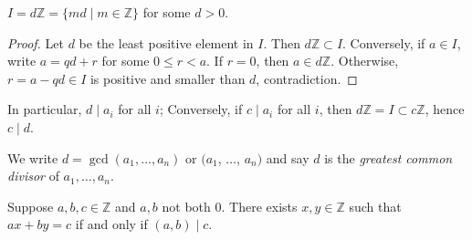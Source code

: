 \documentclass[a4paper, 10pt]{amsart}
\begin{document}
\begin{lemma}
  $I = d \mathbb{Z} = \{md \mid m \in \mathbb{Z}\}$ for some $d > 0$.
\end{lemma}
\begin{proof}
  Let $d$ be the least positive element in $I$. Then $d\mathbb{Z} \subset I$. Conversely, if $a \in I$, write $a = qd + r$ for some $0 \leq r < a$. If $r = 0$, then $a \in d \mathbb{Z}$. Otherwise, $r = a - qd \in I$ is positive and smaller than $d$, contradiction.
\end{proof}

In particular, $d \mid a_i$ for all $i$; Conversely, if $c \mid a_i$ for all $i$, then $d \mathbb{Z} = I \subset c \mathbb{Z}$, hence $c \mid d$.

\begin{definition}
  We write $d = \gcd(a_1, \dots, a_n)$ or $(a_1$, $\dots$, $a_n)$ and say $d$ is the \emph{greatest common divisor} of $a_1, \dots, a_n$.
\end{definition}

\begin{corollary}[Bézout]
  Suppose $a, b, c \in \mathbb{Z}$ and $a, b$ not both 0. There exists $x, y \in \mathbb{Z}$ such that $ax + by = c$ if and only if $(a, b) \mid c$.
\end{corollary}


\end{document}
